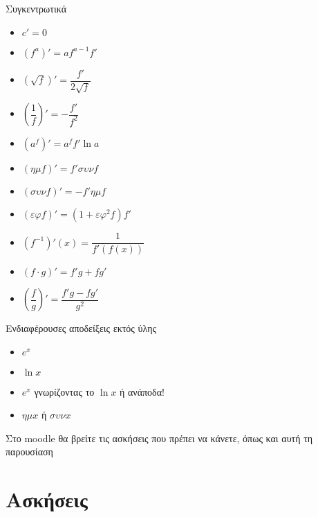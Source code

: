 \documentclass{presentation}
\begin{document}
\begin{frame}{Συγκεντρωτικά}
  \begin{small}
    \begin{multicols}{2}
      \begin{itemize}
        \item $c'=0$
        \item $(f^a)'=af^{a-1}f'$
        \item $\left(\sqrt{f}\right)'=\dfrac{f'}{2\sqrt{f}}$
        \item $\left( \dfrac{1}{f}\right)'=-\dfrac{f'}{f^2}$
        \item $(a^{f})'=a^{f}f'\ln a$
        \item $(ημf)'=f'συνf$
        \item $(συνf)'=-f'ημf$
        \item $(εφf)'=(1+εφ^2f)f'$
        \item $(f^{-1})'(x)=\dfrac{1}{f'(f(x))}$
        \item $(f\cdot g)'=f'g+fg'$
        \item $\left(\dfrac{f}{g}\right)'=\dfrac{f'g-fg'}{g^2}$
      \end{itemize}
    \end{multicols}
  \end{small}
\end{frame}

\begin{frame}{Ενδιαφέρουσες αποδείξεις εκτός ύλης}
  \label{Θεωρία}
  \begin{itemize}
    \item $e^x$ \hyperlink{Απόδειξη1}{}
    \item $\ln x$ \hyperlink{Απόδειξη2}{}
    \item $e^x$ γνωρίζοντας το $\ln x$ ή ανάποδα! \hyperlink{Απόδειξη3}{}
    \item $ημx$ ή $συνx$ \hyperlink{Απόδειξη4}{}
  \end{itemize}
\end{frame}

\begin{frame}[noframenumbering]
  Στο moodle θα βρείτε τις ασκήσεις που πρέπει να κάνετε, όπως και αυτή τη παρουσίαση
\end{frame}

\section{Ασκήσεις}
\end{document}
